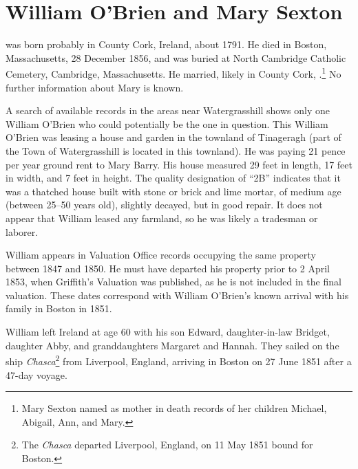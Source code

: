 \section{William O'Brien and Mary Sexton}\label{per:William1OBrien}

 was born probably in County Cork, Ireland, about 1791.\cite{Census1855William:2} He died in Boston, Massachusetts, 28 December 1856,\cite{William1OBrienDeath:1} and was buried at North Cambridge Catholic Cemetery, Cambridge, Massachusetts.\cite{DianaBerberenaLetter1:1} He married, likely in County Cork, .\footnote{Mary Sexton named as mother in death records of her children Michael, Abigail, Ann, and Mary.} No further information about Mary is known.

A search of available records in the areas near Watergrasshill shows only one William O'Brien who could potentially be the one in question. This William O'Brien was leasing a house and garden in the townland of Tinageragh (part of the Town of Watergrasshill is located in this townland). He was paying 21 pence per year ground rent to Mary Barry.\cite{TenureBook1847:1} His house measured 29 feet in length, 17 feet in width, and 7 feet in height.\cite{HouseBook1849} The quality designation of ``2B'' indicates that it was a thatched house built with stone or brick and lime mortar, of medium age (between 25--50 years old), slightly decayed, but in good repair. It does not appear that William leased any farmland, so he was likely a tradesman or laborer.\cite{WilliamOBrienSearch:1} 

William appears in Valuation Office records occupying the same property between 1847\cite{TenureBook1847:2} and 1850.\cite{HouseBook1850} He must have departed his property prior to 2 April 1853, when Griffith's Valuation was published, as he is not included in the final valuation.\cite{WilliamOBrienSearch:2} These dates correspond with William O'Brien's known arrival with his family in Boston in 1851.

William left Ireland at age 60 with his son Edward, daughter-in-law Bridget, daughter Abby, and granddaughters Margaret and Hannah. They sailed on the ship \textit{Chasca}\footnote{The \textit{Chasca} departed Liverpool, England, on 11 May 1851 bound for Boston.} from Liverpool, England, arriving in Boston on 27 June 1851 after a 47-day voyage.\cite{Chascay:5}

